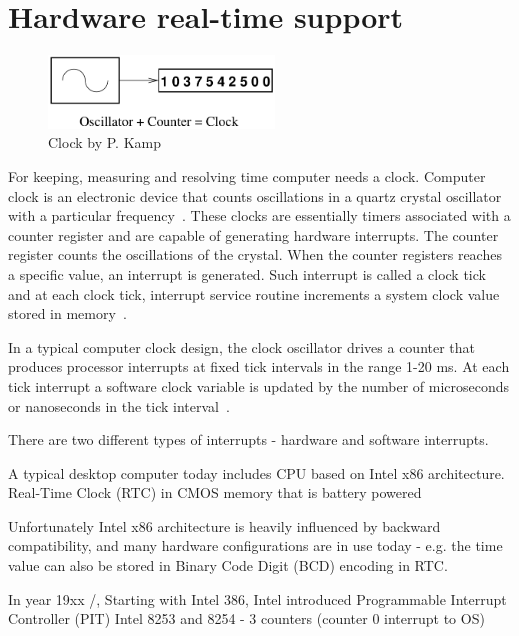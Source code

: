 
\chapter{Hardware real-time support}
\begin{figure}
	\centering
	\includegraphics[width=6cm,keepaspectratio]{fig/clock.png}
	\caption{Clock by P. Kamp}
	\label{fig:hw-clock}
\end{figure}
For keeping, measuring and resolving time computer needs a clock.
Computer clock is an electronic device that counts oscillations in a
quartz crystal oscillator with a particular frequency~\cite{thesis-sync}.
These clocks are essentially timers associated with a counter register and
are capable of generating hardware interrupts.
The counter register counts the oscillations of the crystal.
When the counter registers reaches a specific value,
an interrupt is generated.
Such interrupt is called a clock tick and at each clock tick,
interrupt service routine increments a system clock value stored in memory~\cite{thesis-sync}.

In a typical computer clock design, the clock oscillator drives a counter that produces processor interrupts at
fixed tick intervals in the range 1-20 ms.
At each tick interrupt a software clock variable is updated by the
number of microseconds or nanoseconds in the tick interval~\cite{timecounters}.


There are two different types of interrupts - hardware and software interrupts.

A typical desktop computer today includes CPU based on Intel x86 architecture.
Real-Time Clock (RTC) in CMOS memory that is battery powered

Unfortunately Intel x86 architecture is heavily influenced by backward compatibility,
and many hardware configurations are in use today -
e.g. the time value can also be stored in Binary Code Digit (BCD) encoding in RTC.

In year 19xx /, Starting with Intel 386,
Intel introduced
Programmable Interrupt Controller (PIT) Intel 8253 and 8254 - 3 counters (counter 0 interrupt to OS)

